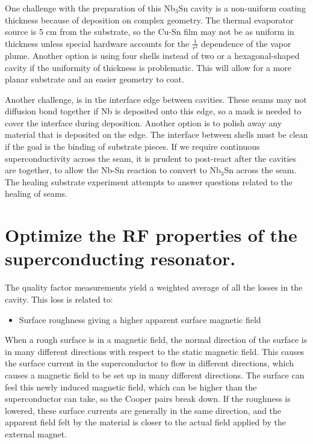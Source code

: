         One challenge with the preparation of this Nb$_3$Sn cavity is a non-uniform coating thickness because of deposition on complex geometry. The thermal evaporator source is 5 cm from the substrate, so the Cu-Sn film may not be as uniform in thickness unless special hardware accounts for the $\frac{1}{r^2}$ dependence of the vapor plume. Another option is using four shells instead of two or a hexagonal-shaped cavity if the uniformity of thickness is problematic. This will allow for a more planar substrate and an easier geometry to coat.
        
        Another challenge, is in the interface edge between cavities. These seams may not diffusion bond together if Nb is deposited onto this edge, so a mask is needed to cover the interface during deposition. Another option is to polish away any material that is deposited on the edge. The interface between shells must be clean if the goal is the binding of substrate pieces. If we require continuous superconductivity across the seam, it is prudent to post-react after the cavities are together, to allow the Nb-Sn reaction to convert to Nb$_3$Sn across the seam. The healing substrate experiment attempts to answer questions related to the healing of seams. 


      \section{Optimize the RF properties of the superconducting resonator.}

        The quality factor measurements yield a weighted average of all the losses in the cavity. This loss is related to:
        
        \begin{itemize}
            \item Surface roughness giving a higher apparent surface magnetic field
        \end{itemize}
        
        When a rough surface is in a magnetic field, the normal direction of the surface is in many different directions with respect to the static magnetic field. This causes the surface current in the superconductor to flow in different directions, which causes a magnetic field to be set up in many different directions. The surface can feel this newly induced magnetic field, which can be higher than the superconductor can take, so the Cooper pairs break down. If the roughness is lowered, these surface currents are generally in the same direction, and the apparent field felt by the material is closer to the actual field applied by the external magnet.
        
